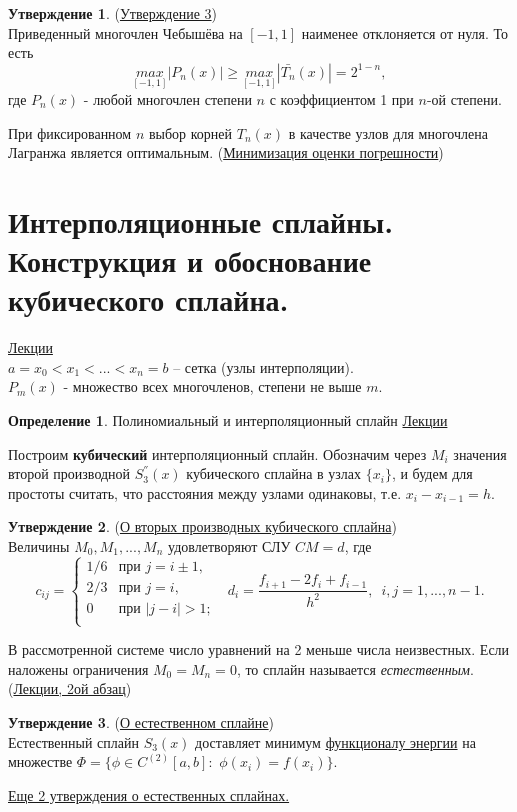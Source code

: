 \documentclass[specialist, subf, href, colorlinks=true, 12pt, times, mtpro, final]{disser}
\theoremstyle{definition}
\newtheorem{defn}{Определение}[section]
\newtheorem{state}{Утверждение}[section]
\begin{document}
    \begin{state} (\hyperlink {lects.19}{Утверждение 3})\\
        Приведенный многочлен Чебышёва на $[-1,1]$ наименее отклоняется от нуля. То есть 
        $$
            \underset{[-1,1]}{max}|P_n(x)| \ge \underset{[-1,1]}{max} |\bar{T_n}(x)| = 2^{1-n},
        $$
        где $P_n(x)$ - любой многочлен степени $n$ с коэффициентом 1 при $n$-ой степени.
    \end{state}

    При фиксированном $n$ выбор корней $T_n(x)$ в качестве узлов для многочлена Лагранжа является оптимальным.
    (\hyperlink {lects.20}{Минимизация оценки погрешности})

    

\section {Интерполяционные сплайны. Конструкция и обоснование кубического сплайна.}
    \hyperlink {lects.22}{Лекции}\\
    $a = x_0 < x_1 < ... < x_n = b$ -- сетка (узлы интерполяции).\\
    $P_m(x)$ - множество всех многочленов, степени не выше $m$.
    \begin{defn}
        Полиномиальный и интерполяционный сплайн \hyperlink {lects.22}{Лекции}
    \end{defn}
    Построим {\bf кубический} интерполяционный сплайн. Обозначим через $M_i$ значения
    второй производной $S_3^{''}(x)$ кубического сплайна в узлах $\{x_i\}$, и будем для
    простоты считать, что расстояния между узлами одинаковы, т.е. $x_i - x_{i-1} = h$.
    \begin{state} (\hyperlink {lects.22}{О вторых производных кубического сплайна})\\
    Величины $M_0, M_1, ..., M_n$ удовлетворяют СЛУ $CM=d$, где
    $$
    c_{ij} =
    \begin{cases}
    1/6 &\text{при } j=i\pm 1,\\
    2/3 &\text{при } j=i,\\
    0   &\text{при } |j-i|>1;\\
    \end{cases}
    \,\,\,\, d_i = \frac{f_{i+1}-2f_i+f_{i-1}}{h^2},\,\,\, i,j = 1,...,n-1.
    $$
    \end{state}
    В рассмотренной системе число уравнений на 2 меньше числа неизвестных. Если наложены
    ограничения $M_0 = M_n = 0$, то сплайн называется {\it естественным}.
    (\hyperlink {lects.23}{Лекции, 2ой абзац})
    \begin{state} (\hyperlink {lects.23}{О естественном сплайне})\\
    Естественный сплайн $S_3(x)$ доставляет минимум
    \hyperlink {lects.23}{функционалу энергии} на множестве
    $\Phi = \{\phi\in C^{(2)}[a,b]:\,\,\phi(x_i)=f(x_i)\}$.
    \end{state}
    \noindent \hyperlink{lects.24}{Еще 2 утверждения о естественных сплайнах.}
\end{document}
